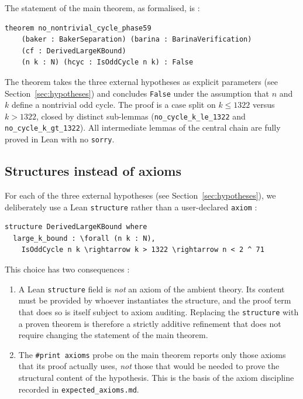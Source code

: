 The statement of the main theorem, as formalised, is :

\begin{lstlisting}[caption={Central theorem declaration (\texttt{Phase59ContinuedFractions.lean}:236).},label={lst:central}]
theorem no_nontrivial_cycle_phase59
    (baker : BakerSeparation) (barina : BarinaVerification)
    (cf : DerivedLargeKBound)
    (n k : N) (hcyc : IsOddCycle n k) : False
\end{lstlisting}

The theorem takes the three external hypotheses as explicit
parameters (see Section~\ref{sec:hypotheses}) and concludes
\texttt{False} under the assumption that \(n\) and \(k\) define a nontrivial
odd cycle. The proof is a case split on \(k \leq 1322\) versus \(k > 1322\),
closed by distinct sub-lemmas (\texttt{no\_cycle\_k\_le\_1322} and
\texttt{no\_cycle\_k\_gt\_1322}). All intermediate lemmas of the central
chain are fully proved in Lean with no \texttt{sorry}.

\subsection{Structures instead of axioms}

For each of the three external hypotheses (see Section~\ref{sec:hypotheses}),
we deliberately use a Lean \texttt{structure} rather than a user-declared
\texttt{axiom} :

\begin{lstlisting}[caption={\texttt{DerivedLargeKBound} as a structure (\texttt{Phase59ContinuedFractions.lean}:115).}]
structure DerivedLargeKBound where
  large_k_bound : \forall (n k : N),
    IsOddCycle n k \rightarrow k > 1322 \rightarrow n < 2 ^ 71
\end{lstlisting}

This choice has two consequences :

\begin{enumerate}
  \item A Lean \texttt{structure} field is \emph{not} an axiom of the
        ambient theory. Its content must be provided by whoever
        instantiates the structure, and the proof term that does so is
        itself subject to axiom auditing. Replacing the \texttt{structure}
        with a proven theorem is therefore a strictly additive refinement
        that does not require changing the statement of the main theorem.
  \item The \texttt{\#print axioms} probe on the main theorem reports only
        those axioms that its proof actually uses, \emph{not} those that
        would be needed to prove the structural content of the hypothesis.
        This is the basis of the axiom discipline recorded in
        \texttt{expected\_axioms.md}.
\end{enumerate}


